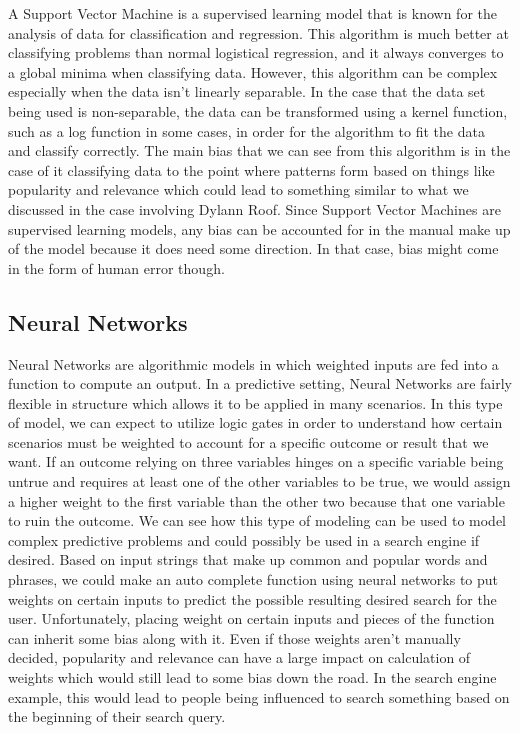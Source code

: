 \documentclass[sigconf]{acmart}
\begin{document}
A Support Vector Machine is a supervised learning model that is known for the analysis of data for classification and regression. This algorithm is much better at classifying problems than normal logistical regression, and it always converges to a global minima when classifying data. However, this algorithm can be complex especially when the data isn't linearly separable. In the case that the data set being used is non-separable, the data can be transformed using a kernel function, such as a log function in some cases, in order for the algorithm to fit the data and classify correctly. The main bias that we can see from this algorithm is in the case of it classifying data to the point where patterns form based on things like popularity and relevance which could lead to something similar to what we discussed in the case involving Dylann Roof. Since Support Vector Machines are supervised learning models, any bias can be accounted for in the manual make up of the model because it does need some direction. In that case, bias might come in the form of human error though.

\subsection{Neural Networks}

Neural Networks are algorithmic models in which weighted inputs are fed into a function to compute an output. In a predictive setting, Neural Networks are fairly flexible in structure which allows it to be applied in many scenarios. In this type of model, we can expect to utilize logic gates in order to understand how certain scenarios must be weighted to account for a specific outcome or result that we want. If an outcome relying on three variables hinges on a specific variable being untrue and requires at least one of the other variables to be true, we would assign a higher weight to the first variable than the other two because that one variable to ruin the outcome. We can see how this type of modeling can be used to model complex predictive problems and could possibly be used in a search engine if desired. Based on input strings that make up common and popular words and phrases, we could make an auto complete function using neural networks to put weights on certain inputs to predict the possible resulting desired search for the user. Unfortunately, placing weight on certain inputs and pieces of the function can inherit some bias along with it. Even if those weights aren't manually decided, popularity and relevance can have a large impact on calculation of weights which would still lead to some bias down the road. In the search engine example, this would lead to people being influenced to search something based on the beginning of their search query.
\end{document}
